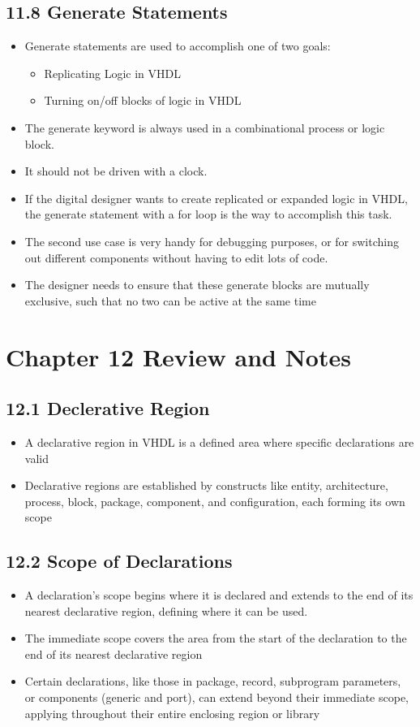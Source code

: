 \documentclass[a4paper,12pt]{article}
\begin{document}
	\subsection*{11.8 Generate Statements}
	\begin{itemize}
		\item Generate statements are used to accomplish one of two goals:
		\begin{itemize}
			\item Replicating Logic in VHDL
			\item Turning on/off blocks of logic in VHDL
		\end{itemize}
		\item The generate keyword is always used in a combinational process or logic block.
		\item It should not be driven with a clock.
		\item If the digital designer wants to create replicated or expanded logic in VHDL, the generate statement with a for loop is the way to accomplish this task.
		\item The second use case is very handy for debugging purposes, or for switching out different components without having to edit lots of code.
		\item The designer needs to ensure that these generate blocks are mutually exclusive, such that no two can be active at the same time
	\end{itemize}
	
	\section*{Chapter 12 Review and Notes}
	\subsection*{12.1 Declerative Region}
	\begin{itemize}
		\item A declarative region in VHDL is a defined area where specific declarations are valid
		\item Declarative regions are established by constructs like entity, architecture, process, block, package, component, and configuration, each forming its own scope
	\end{itemize}
	
	\subsection*{12.2 Scope of Declarations}
	\begin{itemize}
		\item A declaration’s scope begins where it is declared and extends to the end of its nearest declarative region, defining where it can be used.
		\item The immediate scope covers the area from the start of the declaration to the end of its nearest declarative region
		\item Certain declarations, like those in package, record, subprogram parameters, or components (generic and port), can extend beyond their immediate scope, applying throughout their entire enclosing region or library
	\end{itemize}
	
\end{document}
